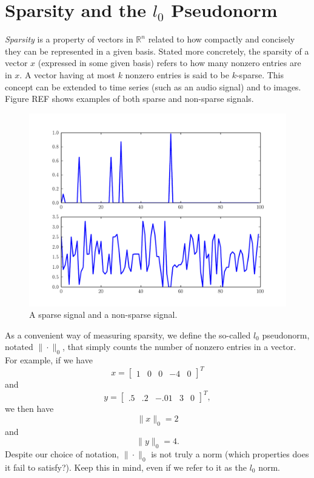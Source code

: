 \section*{Sparsity and the $l_0$ Pseudonorm}
\emph{Sparsity} is a property of vectors in $\mathbb{R}^n$ related to how compactly and concisely they can
be represented in a given basis. Stated more concretely, the sparsity of a vector $x$ (expressed in some given
basis) refers to how many nonzero entries are in $x$. A vector having at most $k$ nonzero entries is said to be
$k$-sparse. This concept can be extended to time series (such as an audio signal) and to images. Figure REF shows
examples of both sparse and non-sparse signals.

\begin{figure}
\centering
\includegraphics[width=\textwidth]{sparse.pdf}
\caption{A sparse signal and a non-sparse signal.}
\label{fig:sparse}
\end{figure}

As a convenient way of measuring sparsity, we define the so-called $l_0$ pseudonorm, notated $\|\cdot\|_0$,
that simply counts the number of nonzero entries in a vector. For example, if we have
\[
x = 
\begin{bmatrix}
1&0&0&-4&0
\end{bmatrix}^T
\]
and
\[
y = 
\begin{bmatrix}
.5&.2&-.01&3&0
\end{bmatrix}^T,
\]
we then have
\[
\|x\|_0 = 2
\]
and
\[
\|y\|_0 = 4.
\]
Despite our choice of notation, $\|\cdot\|_0$ is not truly a norm (which properties does it fail to satisfy?).
Keep this in mind, even if we refer to it as the $l_0$ norm. 

